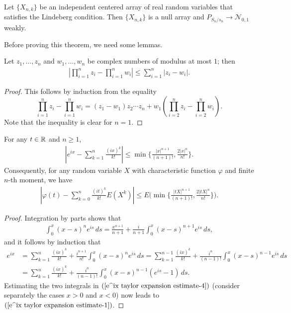 \begin{theorem}\label{CLT of Linderberg}
Let $\{X_{n,k}\}$ be an independent centered array of real random variables that satisfies the Lindeberg condition. Then $\{X_{n,k}\}$ is a null array and $P_{S_n/s_n}\to \mathcal{N}_{0,1}$ weakly.
\end{theorem}
Before proving this theorem, we need some lemmas.
\begin{lemma}\label{product inequality}
Let $z_1,\dots,z_n$ and $w_1,\dots,w_n$ be complex numbers of modulus at most $1$; then
\begin{align*}
|\prod_{i=1}^{n}z_i-\prod_{i=1}^{n}w_i|\leq\sum_{i=1}^{n}|z_i-w_i|.
\end{align*}
\end{lemma}
\begin{proof}
This follows by induction from the equality
\[\prod_{i=1}^{n}z_i-\prod_{i=1}^{n}w_i=(z_1-w_1)z_2\cdots z_n+w_1(\prod_{i=2}^{n}z_i-\prod_{i=2}^{n}w_i).\]
Note that the inequality is clear for $n=1$.
\end{proof}
\begin{lemma}\label{e^ix taylor expansion estimate}
For any $t\in\mathbb{R}$ and $n\geq 1$,
\begin{align}\label{e^ix taylor expansion estimate-1}
|e^{ix}-\sum_{k=1}^{n}\frac{(ix)^k}{k!}|\leq\min\{\frac{|x|^{n+1}}{(n+1)!},\frac{2|x|^n}{n!}\}.
\end{align}
Consequently, for any random variable $X$ with characteristic function $\varphi$ and finite $n$-th moment, we have
\begin{align}\label{e^ix taylor expansion estimate-2}
|\varphi(t)-\sum_{k=0}^{n}\frac{(it)^k}{k!}E(X^k)|\leq E\Big(\min\Big\{\frac{|tX|^{n+1}}{(n+1)!},\frac{2|tX|^n}{n!}\Big\}\Big).
\end{align}
\end{lemma}
\begin{proof}
Integration by parts shows that
\begin{align}\label{e^ix taylor expansion estimate-3}
\int_0^x(x-s)^ne^{is}\,ds=\frac{x^{n+1}}{n+1}+\frac{i}{n+1}\int_0^x(x-s)^{n+1}e^{is}\,ds,
\end{align}
and it follows by induction that
\begin{equation}\label{e^ix taylor expansion estimate-4}
\begin{aligned}
e^{ix}&=\sum_{k=1}^{n}\frac{(ix)^k}{k!}+\frac{i^{n+1}}{n!}\int_0^x(x-s)^ne^{is}\,ds=\sum_{k=1}^{n-1}\frac{(ix)^k}{k!}+\frac{i^{n}}{(n-1)!}\int_0^x(x-s)^{n-1}e^{is}\,ds\\
&=\sum_{k=1}^{n}\frac{(ix)^k}{k!}+\frac{i^{n}}{(n-1)!}\int_0^x(x-s)^{n-1}(e^{is}-1)\,ds.
\end{aligned}
\end{equation}
Estimating the two integrals in $(\ref{e^ix taylor expansion estimate-4})$ (consider separately the cases $x>0$ and $x<0$) now leads to $(\ref{e^ix taylor expansion estimate-1})$.
\end{proof}
